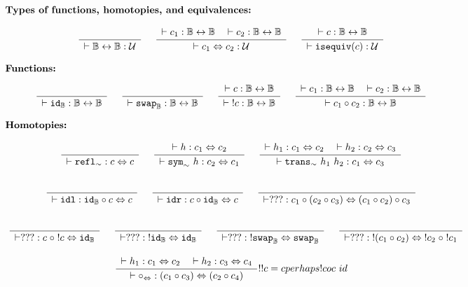 \documentclass[format=acmlarge,review,natbib]{acmart}
\newcommand{\invc}[1]{!#1}
\newcommand{\compc}{\circ}
\newcommand{\reflh}{\mathtt{refl}_{\sim}}
\newcommand{\symh}[1]{\mathtt{sym}_{\sim}~#1}
\newcommand{\transh}[2]{\mathtt{trans}_{\sim}~#1~#2}
\newcommand{\isequiv}[1]{\mathtt{isequiv}(#1)}
\newcommand{\idc}{\mathtt{id}}
\newcommand{\swapc}{\mathtt{swap}}
\newcommand{\idlc}{\mathtt{idl}}
\newcommand{\idrc}{\mathtt{idr}}
\newcommand{\compsim}{\compc_{\isotwo}}
\newcommand{\iso}{\leftrightarrow}
\newcommand{\isotwo}{\Leftrightarrow}
\newcommand{\boolt}{\mathbb{B}}
\newcommand{\univ}{\mathcal{U}}
\newcommand{\Rule}[2]{
\makebox{
$\displaystyle
\frac{\begin{array}{l}#1\\\end{array}}
{\begin{array}{l}#2\\\end{array}}$}}
\newcommand{\proves}{\vdash}
\newcommand{\jdg}[3]{#1 \proves #2 : #3}
\begin{document}
\[\begin{array}{c}
\noalign{\textbf{Types of functions, homotopies, and equivalences:}} \\
\Rule{}{\jdg{}{\boolt\iso\boolt}{\univ}}
\quad
\Rule{\jdg{}{c_1}{\boolt\iso\boolt}
         \quad\jdg{}{c_2}{\boolt\iso\boolt}}
        {\jdg{}{c_1 \isotwo c_2}{\univ}}
\quad
\Rule{\jdg{}{c}{\boolt\iso\boolt}}
        {\jdg{}{\isequiv{c}}{\univ}}
\\
\\
\noalign{\textbf{Functions:}} \\
\Rule{}{\jdg{}{\idc_{\boolt}}{\boolt\iso\boolt}}
\quad
\Rule{}{\jdg{}{\swapc_{\boolt}}{\boolt\iso\boolt}}
\quad
\Rule{\jdg{}{c}{\boolt\iso\boolt}}
        {\jdg{}{\;\invc{c}}{\boolt\iso\boolt}}
\quad
\Rule{\jdg{}{c_1}{\boolt\iso\boolt}
        \quad\jdg{}{c_2}{\boolt\iso\boolt}}
        {\jdg{}{c_1 \compc c_2}{\boolt\iso\boolt}}
\\
\\
\noalign{\textbf{Homotopies:}} \\
\Rule{}
         {\jdg{}{\reflh}{c \isotwo c}}
\quad
\Rule{\jdg{}{h}{c_1 \isotwo c_2}}
        {\jdg{}{\symh{h}}{c_2 \isotwo c_1}}
\quad
\Rule{\jdg{}{h_1}{c_1 \isotwo c_2}
         \quad\jdg{}{h_2}{c_2 \isotwo c_3}}
        {\jdg{}{\transh{h_1}{h_2}}{c_1 \isotwo c_3}}
\\
\\
\Rule{}
        {\jdg{}{\idlc}{\idc_{\boolt} \compc c \isotwo c}}
\quad
\Rule{}
        {\jdg{}{\idrc}{c \compc \idc_{\boolt} \isotwo c}}
\quad
\Rule{}{\jdg{}{???}{c_1 \compc (c_2 \compc c_3) \isotwo (c_1 \compc c_2) \compc c_3}}
\\
\\
\quad
\Rule{}{\jdg{}{???}{c \;\compc \;\invc{c} \isotwo \idc_{\boolt}}}
\quad
\Rule{}{\jdg{}{???}{\;\invc{\idc_{\boolt}} \isotwo \idc_{\boolt}}}
\quad
\Rule{}{\jdg{}{???}{\;\invc{\swapc_{\boolt}} \isotwo \swapc_{\boolt}}}
\quad
\Rule{}{\jdg{}{???}{\;\invc{(c_1\compc c_2)} \isotwo \;\invc{c_2} \;\compc \;\invc{c_1}}}
\\
\\
\Rule{\jdg{}{h_1}{c_1 \isotwo c_2}
         \quad\jdg{}{h_2}{c_3 \isotwo c_4}}
        {\jdg{}{\compsim}{(c_1 \compc c_3) \isotwo (c_2 \compc c_4)}}

!!c = c
perhaps !c o c ~ id


\end{array}\]
\end{document}
